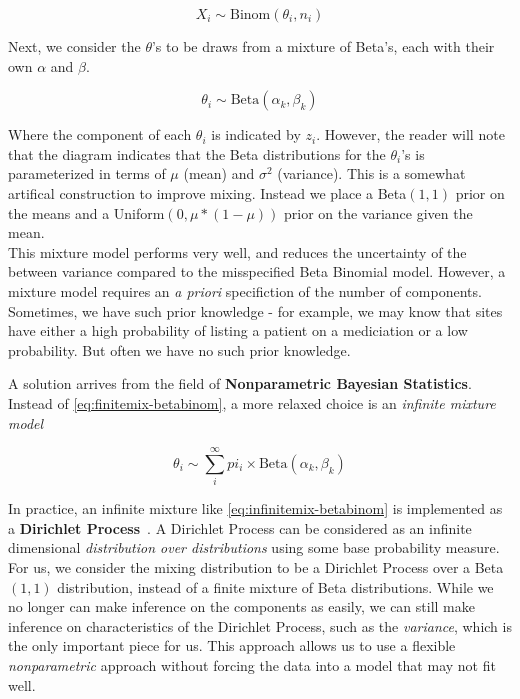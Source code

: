 \documentclass{article}
\begin{document}
\begin{equation}\label{eq:data}
    X_i \sim \text{Binom}(\theta_i, n_i)
\end{equation}

Next, we consider the $\theta$'s to be draws from a mixture of Beta's, each with their own $\alpha$ and $\beta$.

\begin{equation}\label{eq:theta}
    \theta_i \sim \text{Beta}(\alpha_k, \beta_k)
\end{equation}

Where the component of each $\theta_i$ is indicated by $z_i$. However, the reader will note that the diagram indicates that the Beta distributions for the $\theta_i$'s is parameterized in terms of $\mu$ (mean) and $\sigma^2$ (variance). This is a somewhat artifical construction to improve mixing. Instead we place a Beta$(1, 1)$ prior on the means and a Uniform$(0, \mu * (1-\mu))$ prior on the variance given the mean. \\

This mixture model performs very well, and reduces the uncertainty of the between variance compared to the misspecified Beta Binomial model. However, a mixture model requires an \textit{a priori} specifiction of the number of components. Sometimes, we have such prior knowledge - for example, we may know that sites have either a high probability of listing a patient on a mediciation or a low probability. But often we have no such prior knowledge. 

A solution arrives from the field of \textbf{Nonparametric Bayesian Statistics}. Instead of \eqref{eq:finitemix-betabinom}, a more relaxed choice is an \textit{infinite mixture model}

\begin{equation}\label{eq:infinitemix-betabinom}
\theta_i \sim \sum_i^{\infty} pi_i \times \text{Beta}(\alpha_k, \beta_k)
\end{equation}

In practice, an infinite mixture like \eqref{eq:infinitemix-betabinom} is implemented as a \textbf{Dirichlet Process}~\cite{gelman2004,ohlssen2007}. A Dirichlet Process can be considered as an infinite dimensional \textit{distribution over distributions} using some base probability measure. For us, we consider the mixing distribution to be a Dirichlet Process over a Beta$(1, 1)$ distribution, instead of a finite mixture of Beta distributions. While we no longer can make inference on the components as easily, we can still make inference on characteristics of the Dirichlet Process, such as the \textit{variance}, which is the only important piece for us. This approach allows us to use a flexible \textit{nonparametric} approach without forcing the data into a model that may not fit well.
\end{document}
